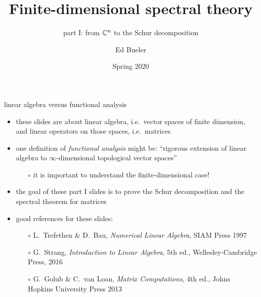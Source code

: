\documentclass[10pt,hyperref]{beamer}
\title[Finite-dimensional spectral theory I]{Finite-dimensional spectral theory}
\subtitle{part I: from $\mathbb{C}^n$ to the Schur decomposition}
\author{Ed Bueler}
\institute[MATH 617]{MATH 617 Functional Analysis}
\date{Spring 2020}
\begin{document}
\beamertemplatenavigationsymbolsempty

\begin{frame}
  \maketitle
\end{frame}


\begin{frame}{linear algebra versus functional analysis}

\begin{itemize}
\item these slides are about linear algebra, i.e.~vector spaces of finite dimension, and linear operators on those spaces, i.e.~matrices
\item one definition of \emph{functional analysis} might be: ``rigorous extension of linear algebra to $\infty$-dimensional topological vector spaces''
    \begin{itemize}
    \item[$\circ$] it is important to understand the finite-dimensional case!
    \end{itemize}
\item the goal of these part I slides is to prove the Schur decomposition and the spectral theorem for matrices
\item good references for these slides:
    \begin{itemize}
    \item[$\circ$] L.~Trefethen \& D.~Bau, \emph{Numerical Linear Algebra}, SIAM Press 1997
    \item[$\circ$] G.~Strang, \emph{Introduction to Linear Algebra}, 5th ed., Wellesley-Cambridge Press, 2016
    \item[$\circ$] G.~Golub \& C.~van Loan, \emph{Matrix Computations}, 4th ed., Johns Hopkins University Press 2013
    \end{itemize}

\end{itemize}
\end{frame}
\end{document}

